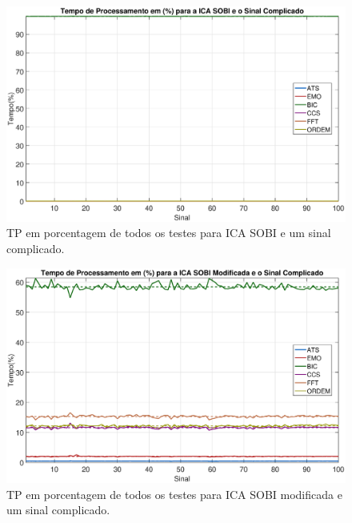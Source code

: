 \documentclass[a4paper,12pt]{monografia}
\theoremstyle{plain}
\theoremstyle{definition}
\theoremstyle{remark}
\begin{document}
\begin{figure}[!htb]
    \begin{center}
    \advance\leftskip -1.5cm
    \includegraphics[scale=0.45]{imagens/ImagensParaOAnexo/TPPEICASOBISinalComplicado.eps}
    \caption{TP em porcentagem de todos os testes para ICA SOBI e um sinal complicado.}
    \label{fig:TPSSSinalComplicado}    
    \end{center}
\end{figure}

\begin{figure}[!htb]
    \begin{center}
    \advance\leftskip -1.5cm
    \includegraphics[scale=0.45]{imagens/ImagensParaOAnexo/TPPEICASOBImodSinalComplicado.eps}
    \caption{TP em porcentagem de todos os testes para ICA SOBI modificada e um sinal complicado.}
    \label{fig:TPSMSinalComplicado}    
    \end{center}
\end{figure}
\end{document}
